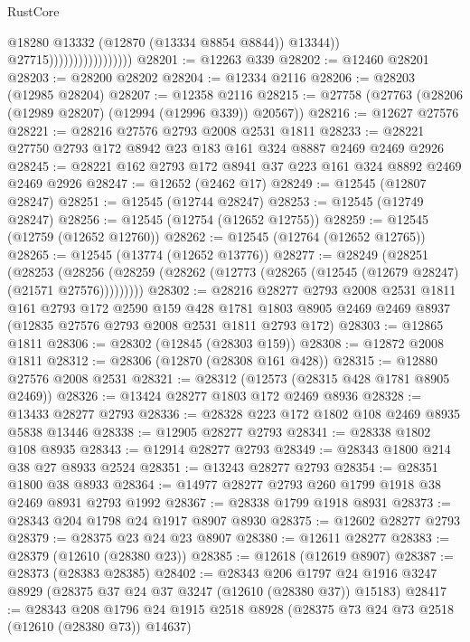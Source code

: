 \begin{lexlean}{RustCore}
\begin{coremodule}
                                          @18280
                                          @13332
                                          (@12870 (@13334 @8854 @8844))
                                          @13344))
                                      @27715)))))))))))))))))
@28201 := @12263 @339
@28202 := @12460 @28201
@28203 := @28200 @28202
@28204 := @12334 @2116
@28206 := @28203 (@12985 @28204)
@28207 := @12358 @2116
@28215 := @27758 (@27763 (@28206 (@12989 @28207) (@12994 (@12996 @339)) @20567))
@28216 := @12627 @27576
@28221 := @28216 @27576 @2793 @2008 @2531 @1811
@28233 := @28221 @27750 @2793 @172 @8942 @23 @183 @161 @324 @8887 @2469 @2469 @2926
@28245 := @28221 @162 @2793 @172 @8941 @37 @223 @161 @324 @8892 @2469 @2469 @2926
@28247 := @12652 (@2462 @17)
@28249 := @12545 (@12807 @28247)
@28251 := @12545 (@12744 @28247)
@28253 := @12545 (@12749 @28247)
@28256 := @12545 (@12754 (@12652 @12755))
@28259 := @12545 (@12759 (@12652 @12760))
@28262 := @12545 (@12764 (@12652 @12765))
@28265 := @12545 (@13774 (@12652 @13776))
@28277 := @28249
    (@28251
      (@28253
        (@28256 (@28259 (@28262 (@12773 (@28265 (@12545 (@12679 @28247) (@21571 @27576)))))))))
@28302 := @28216
    @28277
    @2793
    @2008
    @2531
    @1811
    @161
    @2793
    @172
    @2590
    @159
    @428
    @1781
    @1803
    @8905
    @2469
    @2469
    @8937
    (@12835 @27576 @2793 @2008 @2531 @1811 @2793 @172)
@28303 := @12865 @1811
@28306 := @28302 (@12845 (@28303 @159))
@28308 := @12872 @2008 @1811
@28312 := @28306 (@12870 (@28308 @161 @428))
@28315 := @12880 @27576 @2008 @2531
@28321 := @28312 (@12573 (@28315 @428 @1781 @8905 @2469))
@28326 := @13424 @28277 @1803 @172 @2469 @8936
@28328 := @13433 @28277 @2793
@28336 := @28328 @223 @172 @1802 @108 @2469 @8935 @5838 @13446
@28338 := @12905 @28277 @2793
@28341 := @28338 @1802 @108 @8935
@28343 := @12914 @28277 @2793
@28349 := @28343 @1800 @214 @38 @27 @8933 @2524
@28351 := @13243 @28277 @2793
@28354 := @28351 @1800 @38 @8933
@28364 := @14977 @28277 @2793 @260 @1799 @1918 @38 @2469 @8931 @2793 @1992
@28367 := @28338 @1799 @1918 @8931
@28373 := @28343 @204 @1798 @24 @1917 @8907 @8930
@28375 := @12602 @28277 @2793
@28379 := @28375 @23 @24 @23 @8907
@28380 := @12611 @28277
@28383 := @28379 (@12610 (@28380 @23))
@28385 := @12618 (@12619 @8907)
@28387 := @28373 (@28383 @28385)
@28402 := @28343
    @206
    @1797
    @24
    @1916
    @3247
    @8929
    (@28375 @37 @24 @37 @3247 (@12610 (@28380 @37)) @15183)
@28417 := @28343
    @208
    @1796
    @24
    @1915
    @2518
    @8928
    (@28375 @73 @24 @73 @2518 (@12610 (@28380 @73)) @14637)

\end{coremodule}
\end{lexlean}
